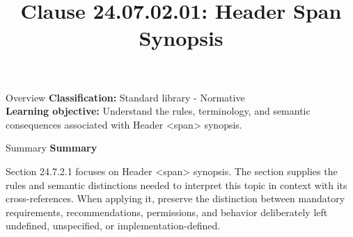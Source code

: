 \documentclass[10pt,letterpaper]{article}
\title{Clause 24.07.02.01: Header Span Synopsis}
\author{}
\date{}
\begin{document}
\maketitle
\begin{CornellOverviewBox}{Overview}
\textbf{Classification:} Standard library - Normative\\[2pt]
\textbf{Learning objective:} Understand the rules, terminology, and semantic consequences associated with Header <span> synopsis.
\end{CornellOverviewBox}\begin{CornellSummaryBox}{Summary}
{\sffamily\bfseries\color{Accent} Summary}\par\vspace{3pt}Section 24.7.2.1 focuses on Header <span> synopsis. The section supplies the rules and semantic distinctions needed to interpret this topic in context with its cross-references. When applying it, preserve the distinction between mandatory requirements, recommendations, permissions, and behavior deliberately left undefined, unspecified, or implementation-defined.
\end{CornellSummaryBox}
\end{document}
